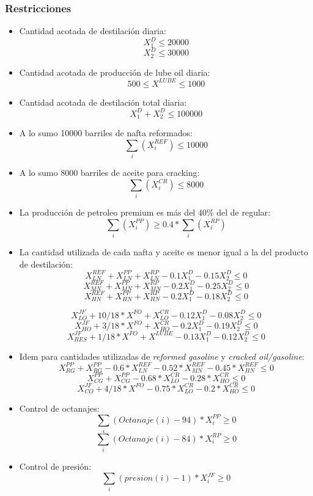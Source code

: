 \subsubsection{Restricciones}
    \begin{itemize}
        \item Cantidad acotada de destilación diaria:
        $$X^D_1 \leq 20000$$
        $$X^D_2 \leq 30000$$

        \item Cantidad acotada de producción de lube oil diaria:
        $$500 \leq X^{LUBE} \leq 1000$$

        \item Cantidad acotada de destilación total diaria:
        $$X^D_1 + X^D_2 \leq 100000$$

        \item A lo sumo 10000 barriles de nafta reformados:
        $$ \sum_i (X^{REF}_i) \leq 10000 $$

        \item A lo sumo 8000 barriles de aceite para cracking:
        $$ \sum_i (X^{CR}_i) \leq 8000 $$

        \item La producción de petroleo premium es más del 40\% del de regular:
        $$ \sum_i (X^{PP}_i) \geq 0.4 * \sum_i (X^{RP}_i) $$

        \item La cantidad utilizada de cada nafta y aceite es menor igual a la del producto de destilación:
        $$ X^{REF}_{LN} + X^{PP}_{LN} + X^{RP}_{LN} - 0.1 X^D_1 - 0.15 X^D_2 \leq 0 $$
        $$ X^{REF}_{MN} + X^{PP}_{MN} + X^{RP}_{MN} - 0.2 X^D_1 - 0.25 X^D_2 \leq 0 $$
        $$ X^{REF}_{HN} + X^{PP}_{HN} + X^{RP}_{HN} - 0.2 X^D_1 - 0.18 X^D_2 \leq 0 $$

        $$ X^{JF}_{LO} + 10/18*X^{FO} + X^{CR}_{LO} - 0.12  X^D_1 - 0.08  X^D_2 \leq 0 $$
        $$ X^{JF}_{HO} + 3/18*X^{FO} + X^{CR}_{HO} - 0.2  X^D_1 - 0.19  X^D_2 \leq 0 $$
        $$ X^{JF}_{RES}+ 1/18*X^{FO}  + X^{LUBE} - 0.13 X^D_1  - 0.12 X^D_2 \leq 0 $$

        \item Idem para cantidades utilizadas de \emph{reformed gasoline} y \emph{cracked oil/gasoline}:
        $$ X^{PP}_{RG} + X^{PP}_{RG} - 0.6 * X^{REF}_{LN} - 0.52 * X^{REF}_{MN} - 0.45 * X^{REF}_{HN} \leq 0 $$
        $$ X^{PP}_{CG} + X^{PP}_{CG} - 0.68 * X^{CR}_{LO} - 0.28 * X^{CR}_{HO} \leq 0 $$
        $$ X^{JF}_{CO} + 4/18 * X^{FO}  - 0.75 * X^{CR}_{LO} - 0.2 * X^{CR}_{HO} \leq 0 $$

        \item Control de octanajes:
        $$ \sum_i (Octanaje(i)-94)*X^{PP}_i \geq 0 $$
        $$ \sum_i (Octanaje(i)-84)*X^{RP}_i \geq 0 $$

        \item Control de presión:
        $$ \sum_i (presion(i)-1)*X^{JF}_i \geq 0  $$
    \end{itemize}

